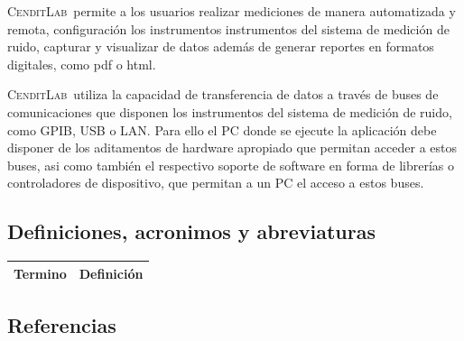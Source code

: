 \documentclass[paper=letter,oneside,fontsize=12pt, parskip=full]{scrartcl}
\newcommand{\AppName}{\textsc{CenditLab}\ }
\newcommand{\smr}{sistema de medición de ruido}
\begin{document}
	\AppName permite a los usuarios realizar mediciones de manera automatizada y remota, configuración los instrumentos instrumentos del \smr, capturar y visualizar de datos además de generar reportes en formatos digitales, como pdf o html.
	
	\AppName utiliza la capacidad de transferencia de datos a través de buses de comunicaciones que disponen los instrumentos del \smr, como GPIB, USB o LAN. Para ello el PC donde se ejecute la aplicación debe disponer de los aditamentos de hardware apropiado que permitan acceder a estos buses, asi como también el respectivo soporte de software en forma de librerías o controladores de dispositivo, que permitan a un PC el acceso a estos buses.
	
	\subsection{Definiciones, acronimos y abreviaturas}
	
	\begin{table}[h!]
		\begin{tabular}{|p{4cm}|p{10cm}|} 
			\hline
			Termino & Definición \\
			\hline
		\end{tabular}	
	\end{table}

	\subsection{Referencias}
	
	
\end{document}
